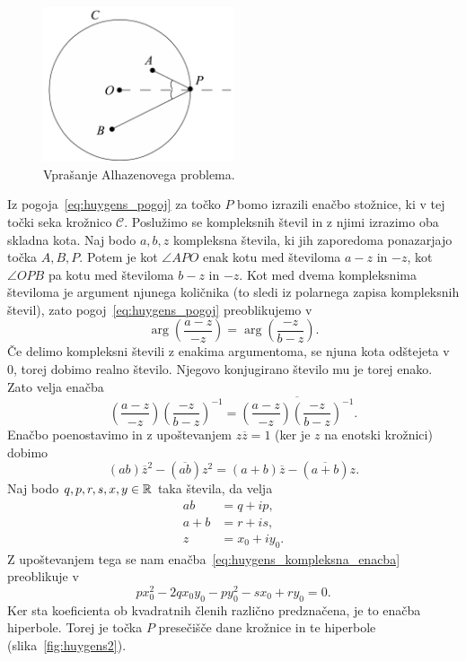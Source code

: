 \begin{figure}[h]
    \centering
    \includegraphics[width=0.5\textwidth]{images/alhazen/huygens1.png}
    \caption[Nastavek Huygensovega reševanja]{Vprašanje Alhazenovega problema.}
    \label{fig:huygens1}
\end{figure}

Iz pogoja~\ref{eq:huygens_pogoj} za točko $P$ bomo izrazili enačbo stožnice, ki v tej točki seka krožnico $\mathcal{C}$. Poslužimo se kompleksnih števil in z njimi izrazimo oba skladna kota. Naj bodo $a, b, z$ kompleksna števila, ki jih zaporedoma ponazarjajo točka $A, B, P$. Potem je kot $\angle APO$ enak kotu med številoma $a-z$ in $-z$, kot $\angle OPB$ pa kotu med številoma $b-z$ in $-z$. Kot med dvema kompleksnima številoma je argument njunega količnika (to sledi iz polarnega zapisa kompleksnih števil), zato pogoj~\ref{eq:huygens_pogoj} preoblikujemo v
$$ \arg \left(\frac{a-z}{-z}\right) = \arg \left(\frac{-z}{b-z}\right). $$
Če delimo kompleksni števili z enakima argumentoma, se njuna kota odštejeta v $0$, torej dobimo realno število. Njegovo konjugirano število mu je torej enako. Zato velja enačba
\begin{equation*}
    \left(\frac{a-z}{-z}\right) \left(\frac{-z}{b-z}\right)^{-1} = \overline{\left(\frac{a-z}{-z}\right) \left(\frac{-z}{b-z}\right)^{-1}}.
\end{equation*}
Enačbo poenostavimo in z upoštevanjem $z \overline{z} = 1$ (ker je $z$ na enotski krožnici) dobimo
\begin{equation}
    \label{eq:huygens_kompleksna_enacba}
    (ab) \overline{z}^2 - (\overline{ab}) z^2 = (a+b) \overline{z} - (\overline{a+b}) z.
\end{equation}
Naj bodo $q, p, r, s, x, y \in \mathbb R$ taka števila, da velja
\begin{align*}
    ab &= q + i p, \\
    a + b &= r + i s, \\
    z &= x_0 + i y_0.
\end{align*}
Z upoštevanjem tega se nam enačba~\ref{eq:huygens_kompleksna_enacba} preoblikuje v
\begin{equation*}
    px_0^2 -2qx_0y_0 -py_0^2 - sx_0 + ry_0 = 0.
\end{equation*}
Ker sta koeficienta ob kvadratnih členih različno predznačena, je to enačba hiperbole. Torej je točka $P$ presečišče dane krožnice in te hiperbole (slika~\ref{fig:huygens2}).

